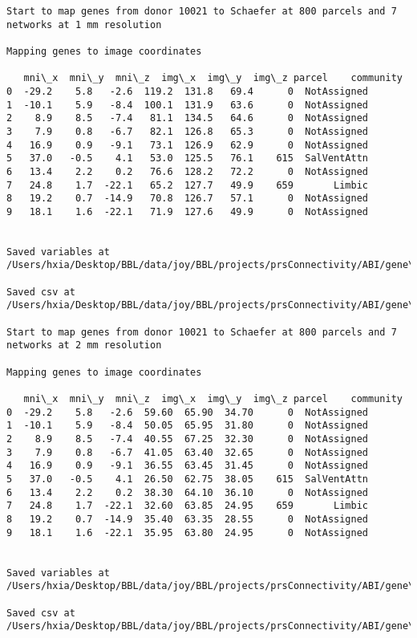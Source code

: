 \documentclass[11pt]{article}
\begin{document}
\begin{Verbatim}[commandchars=\\\{\}]
Start to map genes from donor 10021 to Schaefer at 800 parcels and 7 networks at 1 mm resolution

Mapping genes to image coordinates

   mni\_x  mni\_y  mni\_z  img\_x  img\_y  img\_z parcel    community
0  -29.2    5.8   -2.6  119.2  131.8   69.4      0  NotAssigned
1  -10.1    5.9   -8.4  100.1  131.9   63.6      0  NotAssigned
2    8.9    8.5   -7.4   81.1  134.5   64.6      0  NotAssigned
3    7.9    0.8   -6.7   82.1  126.8   65.3      0  NotAssigned
4   16.9    0.9   -9.1   73.1  126.9   62.9      0  NotAssigned
5   37.0   -0.5    4.1   53.0  125.5   76.1    615  SalVentAttn
6   13.4    2.2    0.2   76.6  128.2   72.2      0  NotAssigned
7   24.8    1.7  -22.1   65.2  127.7   49.9    659       Limbic
8   19.2    0.7  -14.9   70.8  126.7   57.1      0  NotAssigned
9   18.1    1.6  -22.1   71.9  127.6   49.9      0  NotAssigned


Saved variables at /Users/hxia/Desktop/BBL/data/joy/BBL/projects/prsConnectivity/ABI/gene\_mapping/10021donor\_800Parcels\_7Network\_1mm.pkl

Saved csv at /Users/hxia/Desktop/BBL/data/joy/BBL/projects/prsConnectivity/ABI/gene\_mapping/10021donor\_800Parcels\_7Network\_1mm.csv

Start to map genes from donor 10021 to Schaefer at 800 parcels and 7 networks at 2 mm resolution

Mapping genes to image coordinates

   mni\_x  mni\_y  mni\_z  img\_x  img\_y  img\_z parcel    community
0  -29.2    5.8   -2.6  59.60  65.90  34.70      0  NotAssigned
1  -10.1    5.9   -8.4  50.05  65.95  31.80      0  NotAssigned
2    8.9    8.5   -7.4  40.55  67.25  32.30      0  NotAssigned
3    7.9    0.8   -6.7  41.05  63.40  32.65      0  NotAssigned
4   16.9    0.9   -9.1  36.55  63.45  31.45      0  NotAssigned
5   37.0   -0.5    4.1  26.50  62.75  38.05    615  SalVentAttn
6   13.4    2.2    0.2  38.30  64.10  36.10      0  NotAssigned
7   24.8    1.7  -22.1  32.60  63.85  24.95    659       Limbic
8   19.2    0.7  -14.9  35.40  63.35  28.55      0  NotAssigned
9   18.1    1.6  -22.1  35.95  63.80  24.95      0  NotAssigned


Saved variables at /Users/hxia/Desktop/BBL/data/joy/BBL/projects/prsConnectivity/ABI/gene\_mapping/10021donor\_800Parcels\_7Network\_2mm.pkl

Saved csv at /Users/hxia/Desktop/BBL/data/joy/BBL/projects/prsConnectivity/ABI/gene\_mapping/10021donor\_800Parcels\_7Network\_2mm.csv


\end{Verbatim}
\end{document}
